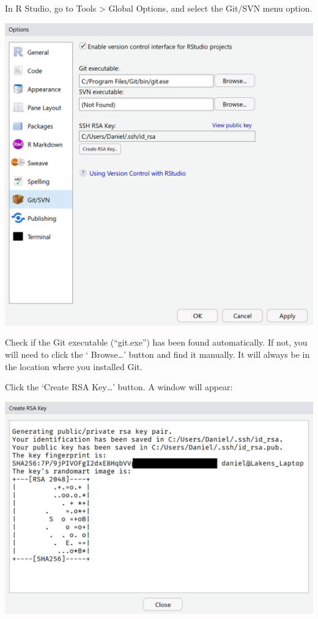 \documentclass[
  oneside]{book}
\begin{document}
In R Studio, go to Tools \textgreater{} Global Options, and select the Git/SVN menu option.

\begin{center}\includegraphics[width=1\linewidth]{images/cfc1e6fc415fb90fad16f4856338b890} \end{center}

Check if the Git executable (``git.exe'') has been found automatically. If not,
you will need to click the ` Browse\ldots' button and find it manually. It will
always be in the location where you installed Git.

Click the `Create RSA Key\ldots{}' button. A window will appear:

\begin{center}\includegraphics[width=1\linewidth]{images/afd9d82e34e9fbff7e9d83c9b89e29c0} \end{center}
\end{document}
